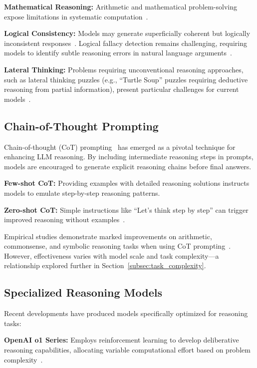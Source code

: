 \textbf{Mathematical Reasoning:} Arithmetic and mathematical problem-solving expose limitations in systematic computation~\cite{cobbe2021gsm8k}.

\textbf{Logical Consistency:} Models may generate superficially coherent but logically inconsistent responses~\cite{jin2022fallacy}. Logical fallacy detection remains challenging, requiring models to identify subtle reasoning errors in natural language arguments~\cite{teo2025fallacy}.

\textbf{Lateral Thinking:} Problems requiring unconventional reasoning approaches, such as lateral thinking puzzles (e.g., ``Turtle Soup'' puzzles requiring deductive reasoning from partial information), present particular challenges for current models~\cite{alhindi2023fallacy}.

\subsection{Chain-of-Thought Prompting}

Chain-of-thought (CoT) prompting~\cite{wei2022cot} has emerged as a pivotal technique for enhancing LLM reasoning. By including intermediate reasoning steps in prompts, models are encouraged to generate explicit reasoning chains before final answers.

\textbf{Few-shot CoT:} Providing examples with detailed reasoning solutions instructs models to emulate step-by-step reasoning patterns.

\textbf{Zero-shot CoT:} Simple instructions like ``Let's think step by step'' can trigger improved reasoning without examples~\cite{kojima2022zerocot}.

Empirical studies demonstrate marked improvements on arithmetic, commonsense, and symbolic reasoning tasks when using CoT prompting~\cite{wei2022cot}. However, effectiveness varies with model scale and task complexity---a relationship explored further in Section~\ref{subsec:task_complexity}.

\subsection{Specialized Reasoning Models}

Recent developments have produced models specifically optimized for reasoning tasks:

\textbf{OpenAI o1 Series:} Employs reinforcement learning to develop deliberative reasoning capabilities, allocating variable computational effort based on problem complexity~\cite{openai2024o1}.

